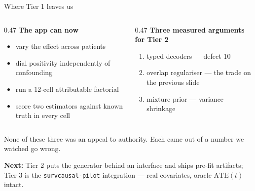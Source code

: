 \documentclass[aspectratio=169]{beamer}
\begin{document}
\begin{frame}{Where Tier 1 leaves us}
  \small
  \begin{columns}[T,totalwidth=\textwidth]
    \begin{column}{0.47\textwidth}
      \textbf{The app can now}
      \begin{itemize}
        \item vary the effect across patients
        \item dial positivity independently of confounding
        \item run a 12-cell attributable factorial
        \item score two estimators against known truth in every cell
      \end{itemize}
    \end{column}
    \begin{column}{0.47\textwidth}
      \textbf{Three measured arguments for Tier 2}
      \begin{enumerate}
        \item typed decoders --- defect 10
        \item overlap regulariser --- the trade on the previous slide
        \item mixture prior --- variance shrinkage
      \end{enumerate}
    \end{column}
  \end{columns}

  \vspace{0.5em}
  None of these three was an appeal to authority. Each came out of a number we
  watched go wrong.

  \vspace{0.3em}
  \textcolor{accent}{\textbf{Next:}} Tier 2 puts the generator behind an interface and
  ships pre-fit artifacts; Tier 3 is the \texttt{survcausal-pilot} integration ---
  real covariates, oracle $\mathrm{ATE}(t)$ intact.
\end{frame}
\end{document}
